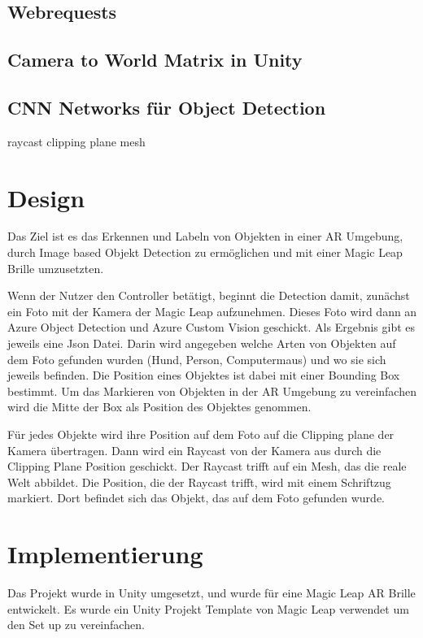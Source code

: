 \documentclass[german,a4paper, 12pt]{llncs}
\begin{document}
\subsection{Webrequests}
\subsection{Camera to World Matrix in Unity}
\subsection{CNN Networks für Object Detection}

raycast
clipping plane
mesh

\section{Design}
Das Ziel ist es das Erkennen und Labeln von Objekten in einer AR Umgebung, durch Image based Objekt Detection zu ermöglichen und mit einer Magic Leap Brille umzusetzten.

Wenn der Nutzer den Controller betätigt, beginnt die Detection damit, zunächst ein Foto mit der Kamera der Magic Leap aufzunehmen. 
Dieses Foto wird dann an Azure Object Detection und Azure Custom Vision geschickt. 
Als Ergebnis gibt es jeweils eine Json Datei. Darin wird angegeben welche Arten von Objekten auf dem Foto gefunden wurden (Hund, Person, Computermaus) und wo sie sich jeweils befinden. Die Position eines Objektes ist dabei mit einer Bounding Box bestimmt. Um das Markieren von Objekten in der AR Umgebung zu vereinfachen wird die Mitte der Box als Position des Objektes genommen.

Für jedes Objekte wird ihre Position auf dem Foto auf die Clipping plane der Kamera übertragen. Dann wird ein Raycast von der Kamera aus durch die Clipping Plane Position geschickt. Der Raycast trifft auf ein Mesh, das die reale Welt abbildet. Die Position, die der Raycast trifft, wird mit einem Schriftzug markiert. Dort befindet sich das Objekt, das auf dem Foto gefunden wurde.

\section{Implementierung}
Das Projekt wurde in Unity umgesetzt, und wurde für eine Magic Leap AR Brille entwickelt.
Es wurde ein Unity Projekt Template von Magic Leap verwendet um den Set up zu vereinfachen. 
\end{document}
